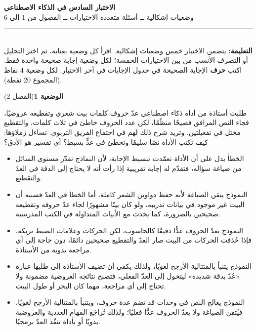 \documentclass[11pt,a4paper]{article}
\begin{document}
\linespread{1.08}\selectfont
\begin{center}
{\LARGE\khatt\textbf{الاختبار السادس في الذكاء الاصطناعي}}\\[4pt]
{\normalsize وضعيات إشكالية ــ أسئلة متعددة الاختيارات ــ الفصول من 1 إلى 6}
\end{center}
\vspace{-2pt}\rule{\textwidth}{0.6pt}\\[2pt]
\textbf{التعليمة:} يتضمن الاختبار خمس وضعيات إشكالية. اقرأ كل وضعية بعناية، ثم اختر التحليل أو التصرف الأنسب
من بين الاختيارات الخمسة؛ لكل وضعية إجابة صحيحة واحدة فقط.
اكتب \textbf{حرف} الإجابة الصحيحة في جدول الإجابات في آخر الاختبار.
لكل وضعية 4 نقاط (المجموع 20 نقطة).
\vspace{4pt}

\noindent
{\large\khatt\textbf{الوضعية 1}}\hfill{\small(الفصل 2)}\par\nopagebreak\vspace{3pt}
\setlength{\fboxsep}{7pt}\colorbox{gray!10}{\parbox{\dimexpr\linewidth-14pt}{طلبت أستاذة من أداة ذكاء اصطناعي عدّ حروف كلمات بيت شعري وتقطيعه عروضيًا، فجاء النص المرافق فصيحًا منظّمًا، لكن عدد الحروف خاطئ في ثلاث كلمات، والتقطيع مختل في تفعيلتين. وتريد شرح ذلك لهم في اجتماع الفريق التربوي. تساءل زملاؤها: كيف تكتب الأداة نصًا سليمًا وتخطئ في عدٍّ بسيط؟ أي تفسير هو الأدق؟}}\par\nopagebreak
\begin{itemize}[leftmargin=1.0cm, labelsep=6pt, itemsep=3pt, topsep=4pt, parsep=0pt]
  \item[\textbf{أ)}] الخطأ يدل على أن الأداة تعمّدت تبسيط الإجابة، لأن النماذج تقدّر مستوى السائل من صياغة سؤاله، فتقدّم له إجابة تقريبية إذا رأت أنه لا يحتاج إلى الدقة في العدّ والتقطيع.
  \item[\textbf{ب)}] النموذج يتقن الصياغة لأنه حفظ دواوين الشعر كاملة، أما الخطأ في العدّ فسببه أن البيت غير موجود في بيانات تدريبه، ولو كان بيتًا مشهورًا لجاء عدّ حروفه وتقطيعه صحيحين بالضرورة، كما يحدث مع الأبيات المتداولة في الكتب المدرسية.
  \item[\textbf{ج)}] النموذج يعدّ الحروف عدًّا دقيقًا كالحاسوب، لكن الحركات وعلامات الضبط تربكه، فإذا حُذفت الحركات من البيت صار العدّ والتقطيع صحيحين دائمًا، دون حاجة إلى أي مراجعة يدوية من الأستاذة.
  \item[\textbf{د)}] النموذج يتنبأ بالمتتالية الأرجح لغويًا، ولذلك يكفي أن تضيف الأستاذة إلى طلبها عبارة «عُدّ بدقة شديدة» ليتحول إلى العدّ الفعلي، فتصبح نتائجه العروضية مضمونة ولا تحتاج إلى أي مراجعة، مهما كان البحر أو طول البيت.
  \item[\textbf{هـ)}] النموذج يعالج النص في وحدات قد تضم عدة حروف، ويتنبأ بالمتتالية الأرجح لغويًا، فيُتقن الصياغة ولا يعدّ الحروف عدًّا فعليًا؛ ولذلك تُراجَع المهام العددية والعروضية يدويًا أو بأداة تنفّذ العدّ برمجيًا.
\end{itemize}
\end{document}
